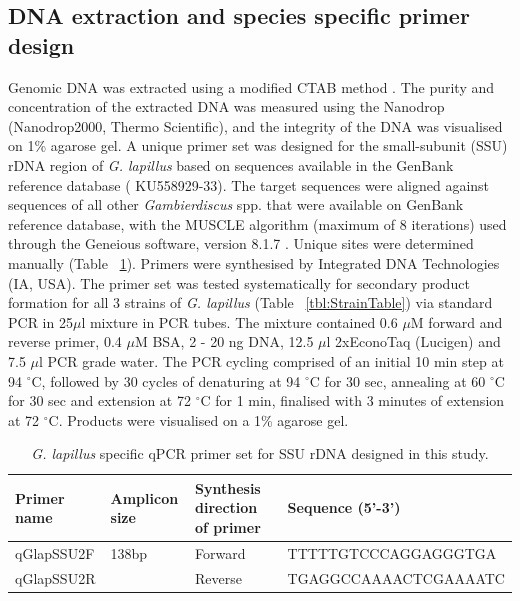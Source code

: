 \documentclass[12pt]{article}
\begin{document}
\subsection*{DNA extraction and species specific primer design}
\FloatBarrier
Genomic DNA was extracted using a modified CTAB method \citep{verma2016molecular}. 
The purity and concentration of the extracted DNA was measured using the Nanodrop (Nanodrop2000, Thermo Scientific), and the integrity of the DNA was visualised on 1\% agarose gel.
A unique primer set was designed for the small-subunit (SSU) rDNA region of \emph{G. lapillus} %
based on sequences available in the GenBank reference database (    KU558929-33). 
The target sequences were aligned against sequences of all other \emph{Gambierdiscus} spp. that were available on GenBank reference database, with the MUSCLE algorithm (maximum of 8 iterations) \citep{edgar2004muscle} used through the Geneious software, version 8.1.7 \citep{kearse2012geneious}. 
Unique sites were determined manually (Table ~\ref{tbl:PrimerTable}). 
Primers were synthesised by Integrated DNA Technologies (IA, USA).
The primer set was tested systematically for secondary product formation for all 3 strains of \emph{G. lapillus} (Table ~\ref{tbl:StrainTable}) via standard PCR in 25$\mu$l mixture in PCR tubes.  %
The mixture contained 0.6 $\mu$M forward and reverse primer, 0.4 $\mu$M BSA, 2 - 20 ng DNA, 12.5 $\mu$l 2xEconoTaq (Lucigen) and 7.5 $\mu$l PCR grade water.
The PCR cycling comprised of an initial 10 min step at 94 $^{\circ}$C, followed by 30 cycles of denaturing at 94 $^{\circ}$C for 30 sec, annealing at 60 $^{\circ}$C for 30 sec and extension at 72 $^{\circ}$C for 1 min, finalised with 3 minutes of extension at 72 $^{\circ}$C. 
Products were visualised on a 1\% agarose gel.
\begin{table}
\caption{\textit{G. lapillus} specific qPCR primer set for SSU rDNA designed in this study.}
\label{tbl:PrimerTable}
\begin{tabular}{ | p{2.5cm} | p{2cm} | p{2cm} | p{6.5cm} | }
\hline
\textbf{Primer name} &\textbf{Amplicon size} &  \textbf{Synthesis direction of primer} & \textbf{Sequence (5'-3')} \\
\hline
qGlapSSU2F&138bp&Forward&TTTTTGTCCCAGGAGGGTGA\\
\hline
qGlapSSU2R&&Reverse&TGAGGCCAAAACTCGAAAATC\\
\hline
\end{tabular}
\end{table}
\FloatBarrier
\end{document}
